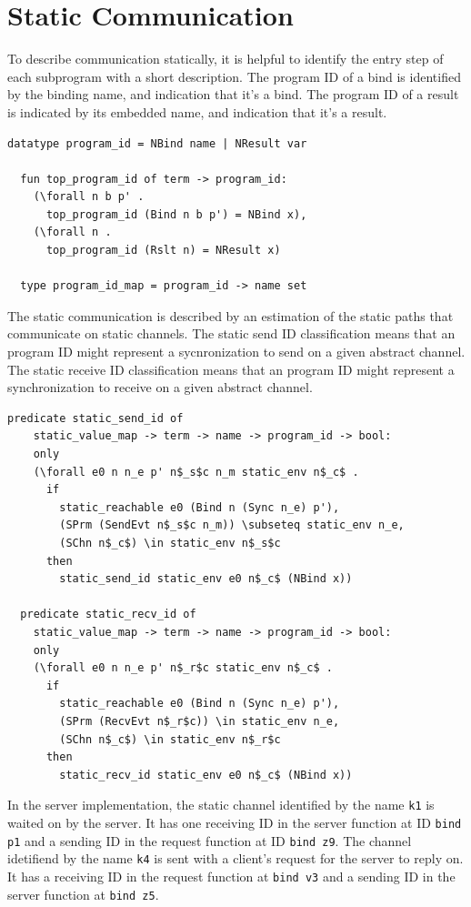 \documentclass[10pt]{article}
\begin{document}
\section{Static Communication}
To describe communication statically, it is helpful to identify the entry
step of each subprogram with a short description. The program ID of a bind is
identified by the binding name, and indication that it's a bind. The program ID
of a result is indicated by its embedded name, and indication that it's a result.

\begin{lstlisting}[language=logic, mathescape]
  datatype program_id = NBind name | NResult var

  fun top_program_id of term -> program_id:
    (\forall n b p' . 
      top_program_id (Bind n b p') = NBind x),
    (\forall n . 
      top_program_id (Rslt n) = NResult x)

  type program_id_map = program_id -> name set

\end{lstlisting}

The static communication is described by an estimation of the static paths that communicate on
static channels.
The static send ID classification means that an program ID might represent a
sycnronization to send on a given abstract channel.
The static receive ID classification means that an program ID might represent a
synchronization to receive on a given abstract channel. 

\begin{lstlisting}[language=logic, mathescape]
  predicate static_send_id of
    static_value_map -> term -> name -> program_id -> bool:
    only
    (\forall e0 n n_e p' n$_s$c n_m static_env n$_c$ .
      if
        static_reachable e0 (Bind n (Sync n_e) p'),
        (SPrm (SendEvt n$_s$c n_m)) \subseteq static_env n_e, 
        (SChn n$_c$) \in static_env n$_s$c
      then
        static_send_id static_env e0 n$_c$ (NBind x))

  predicate static_recv_id of
    static_value_map -> term -> name -> program_id -> bool:
    only
    (\forall e0 n n_e p' n$_r$c static_env n$_c$ .
      if
        static_reachable e0 (Bind n (Sync n_e) p'),
        (SPrm (RecvEvt n$_r$c)) \in static_env n_e, 
        (SChn n$_c$) \in static_env n$_r$c 
      then
        static_recv_id static_env e0 n$_c$ (NBind x))
  \end{lstlisting}


In the server implementation, the static channel identified by the name \lstinline{k1} is waited on
by the server.  It has
one receiving ID in the server function
at ID \lstinline[language=sugar_lang]{bind p1} and a sending ID
in the request function at ID \lstinline[language=sugar_lang]{bind z9}.
The channel idetifiend by the name \lstinline{k4} is sent with a client's request for
the server to reply on. It has a receiving ID in the request function at
\lstinline[language=sugar_lang]{bind v3} and a sending ID in the server function at
\lstinline[language=sugar_lang]{bind z5}.
\end{document}
